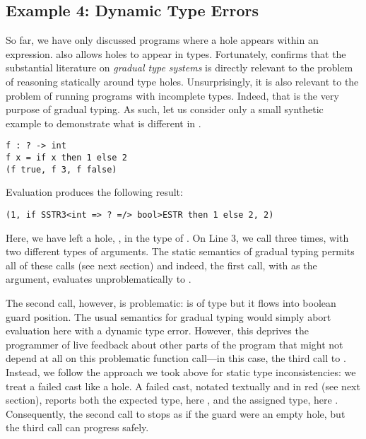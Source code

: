 
\vspace{-4px}
\subsection{Example 4: Dynamic Type Errors}
\label{sec:dynamic-type-errors}
\vspace{-2px}
So far, we have only discussed programs where a hole appears within an expression.
\Hazel also allows holes to appear in types.
Fortunately, \citet{popl-paper} confirms that the substantial literature on \emph{gradual type systems} \cite{Siek06a,DBLP:conf/snapl/SiekVCB15} is directly relevant to the problem of reasoning statically around type holes.
Unsurprisingly, it is also relevant to the problem of running 
programs with incomplete types. Indeed, that is the very purpose of gradual typing. As such, let us consider only a small synthetic example to demonstrate what is different in \Hazel.
\begin{lstlisting}
f : ? -> int
f x = if x then 1 else 2
(f true, f 3, f false)
\end{lstlisting}
Evaluation produces the following result:
\begin{lstlisting}[numbers=none]
(1, if SSTR3<int => ? =/> bool>ESTR then 1 else 2, 2)
\end{lstlisting}
Here, we have left a hole, , in the type of . On Line 3, we call  three times, with two different types of arguments. The static semantics of gradual typing permits all of these calls (see next section) and indeed, the first call, with  as the argument, evaluates unproblematically to . 

The second call, however, is problematic:  is of type  but it flows into boolean guard position. The usual semantics for gradual typing would simply abort evaluation here with a dynamic type error. However, this deprives the programmer of live feedback about other parts of the program that might not depend at all on this problematic function call---in this case, the third call to . Instead, we follow the approach we took above for static type inconsistencies: we treat a failed cast like a hole. A failed cast, notated textually and in red  (see next section), reports both the expected type, here , and the assigned type, here . Consequently, the second call to  stops as if the guard were an empty hole, but the third call can progress safely.

